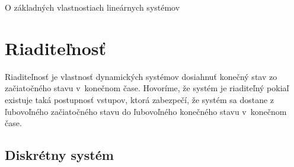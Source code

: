 \documentclass[a4paper, 10pt, ]{article}
\begin{document}
\begin{flushleft}
    O základných vlastnostiach lineárnych systémov
\end{flushleft}

\bigskip

\normalsize
\normalfont



\section{Riaditeľnosť}

Riaditeľnosť je vlastnosť dynamických systémov dosiahnuť konečný stav zo začiatočného stavu v~konečnom čase. Hovoríme, že systém je riaditeľný pokiaľ existuje taká postupnosť vstupov, ktorá zabezpečí, že systém sa dostane z ľubovoľného začiatočného stavu do ľubovoľného konečného stavu v~konečnom čase.

\subsection{Diskrétny systém}
\end{document}

